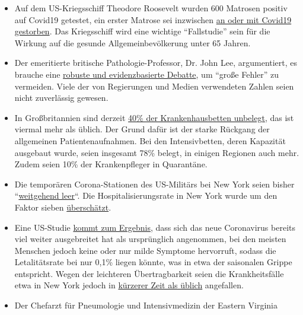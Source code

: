 \begin{itemize}
\tightlist
\item
  Auf dem US-Kriegsschiff Theodore Roosevelt wurden 600 Matrosen positiv
  auf Covid19 getestet, ein erster Matrose sei inzwischen
  \href{https://www.theguardian.com/world/2020/apr/14/sailor-dies-from-covid-19-and-600-test-positive-after-outbreak-on-uss-theodore-roosevelt-guam}{an
  oder mit Covid19 gestorben}. Das Kriegsschiff wird eine wichtige
  ``Fallstudie'' sein für die Wirkung auf die gesunde
  Allgemeinbevölkerung unter 65 Jahren.
\item
  Der emeritierte britische Pathologie-Professor, Dr. John Lee,
  argumentiert, es brauche eine
  \href{https://www.spectator.co.uk/article/to-understand-covid-we-need-evidence-scepticism-and-vigorous-debate}{robuste
  und evidenzbasierte Debatte}, um ``große Fehler'' zu vermeiden. Viele
  der von Regierungen und Medien verwendeten Zahlen seien nicht
  zuverlässig gewesen.
\item
  In Großbritannien sind derzeit
  \href{https://www.hsj.co.uk/acute-care/nhs-hospitals-have-four-times-more-empty-beds-than-normal/7027392.article}{40\%
  der Krankenhausbetten unbelegt}, das ist viermal mehr als üblich. Der
  Grund dafür ist der starke Rückgang der allgemeinen
  Patientenaufnahmen. Bei den Intensivbetten, deren Kapazität ausgebaut
  wurde, seien insgesamt 78\% belegt, in einigen Regionen auch mehr.
  Zudem seien 10\% der Krankenpfleger in Quarantäne.
\item
  Die temporären Corona-Stationen des US-Militärs bei New York seien
  bisher
  ``\href{https://nypost.com/2020/04/09/usns-comfort-and-javits-center-mostly-empty-amid-coronavirus/}{weitgehend
  leer}``. Die Hospitalisierungsrate in New York wurde um den Faktor
  sieben
  \href{https://www.nytimes.com/2020/04/10/nyregion/new-york-coronavirus-hospitals.html}{überschätzt}.
\item
  Eine US-Studie
  \href{https://www.medrxiv.org/content/10.1101/2020.04.01.20050542v1}{kommt
  zum Ergebnis}, dass sich das neue Coronavirus bereits viel weiter
  ausgebreitet hat als ursprünglich angenommen, bei den meisten Menschen
  jedoch keine oder nur milde Symptome hervorruft, sodass die
  Letalitätsrate bei nur 0,1\% liegen könnte, was in etwa der saisonalen
  Grippe entspricht. Wegen der leichteren Übertragbarkeit seien die
  Krankheitsfälle etwa in New York jedoch in
  \href{https://archive.is/7w2XE}{kürzerer Zeit als üblich} angefallen.
\item
  Der Chefarzt für Pneumologie und Intensivmedizin der Eastern Virginia

\end{itemize}
